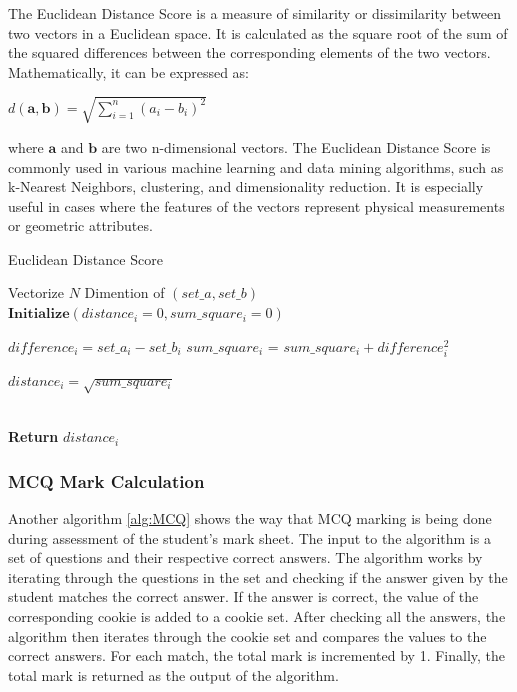 The Euclidean Distance Score is a measure of similarity or dissimilarity between two vectors in a Euclidean space. It is calculated as the square root of the sum of the squared differences between the corresponding elements of the two vectors. Mathematically, it can be expressed as:

$d(\mathbf{a}, \mathbf{b}) = \sqrt{\sum_{i=1}^{n} (a_i - b_i)^2}$

where $\mathbf{a}$ and $\mathbf{b}$ are two n-dimensional vectors. The Euclidean Distance Score is commonly used in various machine learning and data mining algorithms, such as k-Nearest Neighbors, clustering, and dimensionality reduction. It is especially useful in cases where the features of the vectors represent physical measurements or geometric attributes.


\begin{algorithm}
\caption{Euclidean Distance Score}\label{alg:euclidean}
\begin{algorithmic}[1]

\Ensure Vectorize $N$ Dimention of $(set\_a, set\_b)$
\State $\textbf{Initialize} (distance_i = 0, sum\_square_i = 0)$

    \State $difference_i = set\_a_i - set\_b_i$
    \State $sum\_square_i$ = $sum\_square_i + difference_i^2$
    
\EndFor
\State $distance_i = \sqrt{sum\_square_i}$

\\\textbf{Return}
\textit{$distance_i$}
\end{algorithmic}
\end{algorithm}


\newpage

\subsubsection{MCQ Mark Calculation}
Another algorithm \ref{alg:MCQ} shows the way that MCQ marking is being done during assessment of the student’s mark sheet. The input to the algorithm is a set of questions and their respective correct answers. The algorithm works by iterating through the questions in the set and checking if the answer given by the student matches the correct answer. If the answer is correct, the value of the corresponding cookie is added to a cookie set. After checking all the answers, the algorithm then iterates through the cookie set and compares the values to the correct answers. For each match, the total mark is incremented by 1. Finally, the total mark is returned as the output of the algorithm.



